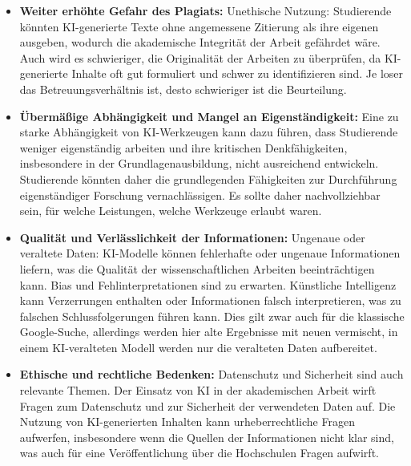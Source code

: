 \documentclass[conference]{IEEEtran}
\begin{document}
\begin{itemize}[leftmargin=*]
    \item \textbf{Weiter erhöhte Gefahr des Plagiats:}
    \newline Unethische Nutzung: Studierende könnten KI-generierte Texte ohne angemessene Zitierung als ihre eigenen ausgeben, wodurch die akademische Integrität der Arbeit gefährdet wäre.
    \newline Auch wird es schwieriger, die Originalität der Arbeiten zu überprüfen, da KI-generierte Inhalte oft gut formuliert und schwer zu identifizieren sind. Je loser das Betreuungsverhältnis ist, desto schwieriger ist die Beurteilung. 

    \item \textbf{Übermäßige Abhängigkeit und Mangel an Eigenständigkeit:}
    \newline Eine zu starke Abhängigkeit von KI-Werkzeugen kann dazu führen, dass Studierende weniger eigenständig arbeiten und ihre kritischen Denkfähigkeiten, insbesondere in der Grundlagenausbildung, nicht ausreichend entwickeln.
    \newline Studierende könnten daher die grundlegenden Fähigkeiten zur Durchführung eigenständiger Forschung vernachlässigen. Es sollte daher nachvollziehbar sein, für welche Leistungen, welche Werkzeuge erlaubt waren.

    \item \textbf{Qualität und Verlässlichkeit der Informationen:}
    \newline Ungenaue oder veraltete Daten: KI-Modelle können fehlerhafte oder ungenaue Informationen liefern, was die Qualität der wissenschaftlichen Arbeiten beeinträchtigen kann.
    \newline Bias und Fehlinterpretationen sind zu erwarten. Künstliche Intelligenz kann Verzerrungen enthalten oder Informationen falsch interpretieren, was zu falschen Schlussfolgerungen führen kann.  Dies gilt zwar auch für die klassische Google-Suche, allerdings werden hier alte Ergebnisse mit neuen vermischt, in einem KI-veralteten Modell werden nur die veralteten Daten aufbereitet. 

    \item \textbf{Ethische und rechtliche Bedenken:}
    \newline Datenschutz und Sicherheit sind auch relevante Themen. Der Einsatz von KI in der akademischen Arbeit wirft Fragen zum Datenschutz und zur Sicherheit der verwendeten Daten auf.
    \newline Die Nutzung von KI-generierten Inhalten kann urheberrechtliche Fragen aufwerfen, insbesondere wenn die Quellen der Informationen nicht klar sind, was auch für eine Veröffentlichung über die Hochschulen Fragen aufwirft.
\end{itemize}
\end{document}
